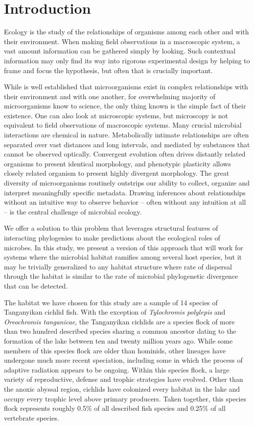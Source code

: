 \section{Introduction}

Ecology is the study of the relationships of organisms among each other and with their environment. When making field observations in a macroscopic system, a vast amount information can be gathered simply by looking. Such contextual information may only find its way into rigorous experimental design by helping to frame and focus the hypothesis, but often that is crucially important.

While is well established that microorganisms exist in complex relationships with their environment and with one another, for overwhelming majority of microorganisms know to science, the only thing known is the simple fact of their existence. One can also look at microscopic systems, but microscopy is not equivalent to field observations of macroscopic systems. Many crucial microbial interactions are chemical in nature. Metabolically intimate relationships are often separated over vast distances and long intervals, and mediated by substances that cannot be observed optically. Convergent evolution often drives distantly related organisms to present identical morphology, and phenotypic plasticity allows closely related organism to present highly divergent morphology. The great diversity of microorganisms routinely outstrips our ability to collect, organize and interpret meaningfully specific metadata. Drawing inferences about relationships without an intuitive way to observe behavior -- often without any intuition at all -- is the central challenge of microbial ecology. 

We offer a solution to this problem that leverages structural features of interacting phylogenies to make predictions about the ecological roles of microbes. In this study, we present a version of this approach that will work for systems where the microbial habitat ramifies among several host species, but it may be trivially generalized to any habitat structure where rate of dispersal through the habitat is similar to the rate of microbial phylogenetic divergence that can be detected.

The habitat we have chosen for this study are a sample of 14 species of Tanganyikan cichlid fish. With the exception of {\em Tylochromis polylepis} and {\em Oreochromis tanganicae}, the Tanganyikan cichlids are a species flock of more than two hundred described species sharing a common ancestor dating to the formation of the lake between ten and twenty million years ago. While some members of this species flock are older than hominids, other lineages have undergone much more recent speciation, including some in which the process of adaptive radiation appears to be ongoing. Within this species flock, a large variety of reproductive, defense and trophic strategies have evolved. Other than the anoxic abyssal region, cichlids have colonized every habitat in the lake and occupy every trophic level above primary producers. Taken together, this species flock represents roughly 0.5\% of all described fish species and 0.25\% of all vertebrate species.

